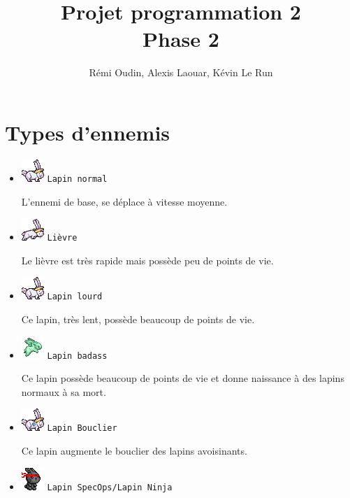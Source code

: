\documentclass{article}
\title{Projet programmation 2\\Phase 2}
\author{R\'emi Oudin, Alexis Laouar, K\'evin Le Run}
\date{}
\begin{document}
\maketitle

\section{Types d'ennemis}

\begin{itemize}

\item \includegraphics{bunny_alt1.png} \texttt{Lapin normal}

L'ennemi de base, se d\'eplace \`a vitesse moyenne.

\item \includegraphics{hare_alt1.png} \texttt{Li\`evre}

Le li\`evre est tr\`es rapide mais poss\`ede peu de points de vie.

\item \includegraphics{bunny_alt1.png} \texttt{Lapin lourd}

Ce lapin, tr\`es lent, poss\`ede beaucoup de points de vie.

\item \includegraphics{badassbunny.png} \texttt{Lapin badass}

Ce lapin poss\`ede beaucoup de points de vie et donne naissance \`a des lapins
normaux \`a sa mort.

\item \includegraphics{shield_bunny.png} \texttt{Lapin Bouclier}

Ce lapin augmente le bouclier des lapins avoisinants.

\item \includegraphics{ninja.png} \texttt{Lapin SpecOps/Lapin Ninja}


\end{itemize}
\end{document}
